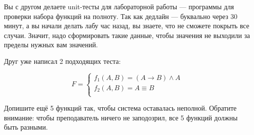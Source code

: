 \question
Вы с другом делаете unit-тесты для лабораторной работы — программы для проверки набора функций на полноту. Так как дедлайн — буквально через 30 минут, а вы начали делать лабу час назад, вы знаете, что не сможете покрыть все случаи. Значит, надо сформировать такие данные, чтобы значения не выходили за пределы нужных вам значений.

Друг уже написал 2 подходящих теста:

\begin{equation*}
    F=
    \begin{cases}
        f_1(A,B)=(A \rightarrow B) \land A\\
        f_2(A,B)=A \equiv B\\
    \end{cases}
\end{equation*}
    
Допишите ещё 5 функций так, чтобы система оставалась неполной. Обратите внимание: чтобы преподаватель ничего не заподозрил, все 5 функций должны быть разными.